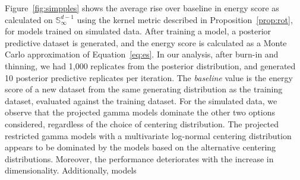 Figure~\ref{fig:simpples} shows the average rise over baseline in energy score as
    calculated on $\mathbb{S}_{\infty}^{d-1}$ using the kernel metric described
    in Proposition~\ref{prop:rot}, for models trained on simulated data.  After training
    a model, a posterior predictive dataset is generated, and the energy score is
    calculated as a Monte Carlo approximation of Equation~\eqref{eq:es}.  In our analysis,
    after burn-in and thinning, we had 1,000 replicates from the posterior distribution, and
    generated 10 posterior predictive replicates per iteration.
    The \emph{baseline} value is the energy score of a new dataset from the same
    generating distribution as the training dataset, evaluated against the training 
    dataset.  
    For the simulated data, we observe that the projected gamma models dominate the other two
    options considered, regardless of the choice of centering distribution.  The  projected 
    restricted gamma models with a multivariate log-normal centering distribution appears to 
    be dominated by the models based on the alternative centering distributions. Moreover, the
    performance deteriorates with the increase in dimensionality. Additionally, models
